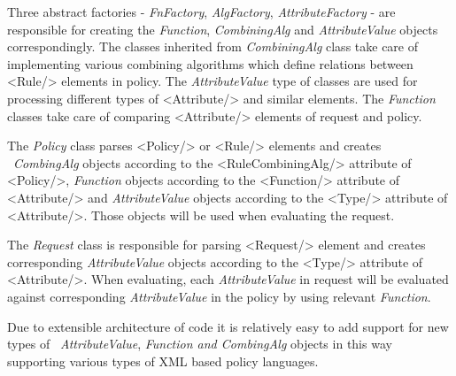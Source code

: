 \documentclass{article}
\begin{document}
{\upshape\color{black}
Three abstract factories - \textit{FnFactory}, \textit{AlgFactory},
\textit{AttributeFactory} - are responsible for creating the
\textit{Function}, \textit{CombiningAlg} and \textit{AttributeValue}
objects correspondingly. The classes inherited from
\textit{CombiningAlg} class take care of implementing various combining
algorithms which define relations between
{\textless}Rule/{\textgreater} elements in policy. The
\textit{AttributeValue} type of classes are used for processing
different types of {\textless}Attribute/{\textgreater} and similar
elements. The \textit{Function} classes take care of comparing
{\textless}Attribute/{\textgreater} elements of request and policy. }

{\upshape\color{black}
The \textit{Policy} class parses {\textless}Policy/{\textgreater} or
{\textless}Rule/{\textgreater} elements and creates
\ \textit{CombingAlg} objects according to the
{\textless}RuleCombiningAlg/{\textgreater} attribute of
{\textless}Policy/{\textgreater}, \textit{Function} objects according
to the {\textless}Function/{\textgreater} attribute of
{\textless}Attribute/{\textgreater} and \textit{AttributeValue} objects
according to the {\textless}Type/{\textgreater} attribute of
{\textless}Attribute/{\textgreater}. Those objects will be used when
evaluating the request.}

{\upshape\color{black}
The \textit{Request} class is responsible for parsing
{\textless}Request/{\textgreater} element and creates corresponding
\textit{AttributeValue} objects according to the
{\textless}Type/{\textgreater} attribute of
{\textless}Attribute/{\textgreater}. When evaluating, each
\textit{AttributeValue} in request will be evaluated against
corresponding \textit{AttributeValue} in the policy by using relevant
\textit{Function}.}

{\upshape\color{black}
Due to extensible architecture of code it is relatively easy to add
support for new types of \ \textit{AttributeValue}, \textit{Function
and CombingAlg} objects in this way supporting various types of XML
based policy languages.}


\includegraphics[width=0in,height=0.0161in]{SecurityFrameworkofARC1-img3.png}

\includegraphics[width=0in,height=0.0161in]{SecurityFrameworkofARC1-img4.png}
\end{document}
